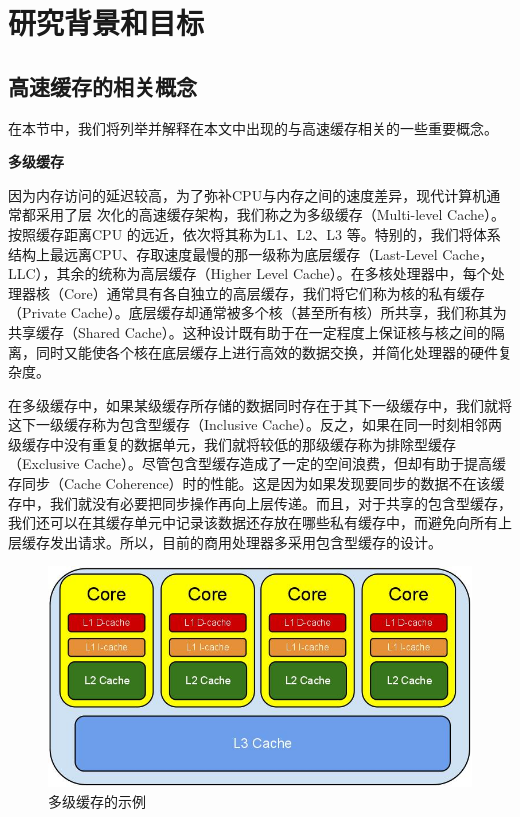 
\chapter{研究背景和目标} \label{chap:related}
\section{高速缓存的相关概念}
在本节中，我们将列举并解释在本文中出现的与高速缓存相关的一些重要概念。

\textbf{多级缓存}

因为内存访问的延迟较高，为了弥补CPU与内存之间的速度差异，现代计算机通常都采用了层
次化的高速缓存架构，我们称之为多级缓存（Multi-level Cache）。按照缓存距离CPU 的远近，依次将其称为L1、L2、L3 等。特别的，我们将体系结构上最远离CPU、存取速度最慢的那一级称为底层缓存（Last-Level Cache，LLC），其余的统称为高层缓存（Higher Level Cache）。在多核处理器中，每个处理器核（Core）通常具有各自独立的高层缓存，我们将它们称为核的私有缓存（Private Cache）。底层缓存却通常被多个核（甚至所有核）所共享，我们称其为共享缓存（Shared Cache）。这种设计既有助于在一定程度上保证核与核之间的隔离，同时又能使各个核在底层缓存上进行高效的数据交换，并简化处理器的硬件复杂度。

在多级缓存中，如果某级缓存所存储的数据同时存在于其下一级缓存中，我们就将这下一级缓存称为包含型缓存（Inclusive Cache）。反之，如果在同一时刻相邻两级缓存中没有重复的数据单元，我们就将较低的那级缓存称为排除型缓存（Exclusive Cache）。尽管包含型缓存造成了一定的空间浪费，但却有助于提高缓存同步（Cache Coherence）时的性能。这是因为如果发现要同步的数据不在该缓存中，我们就没有必要把同步操作再向上层传递。而且，对于共享的包含型缓存，我们还可以在其缓存单元中记录该数据还存放在哪些私有缓存中，而避免向所有上层缓存发出请求。所以，目前的商用处理器多采用包含型缓存的设计。

\begin{figure}[htbp] 
    \centering
    \includegraphics[width=0.7\linewidth]{figures/CacheHierarchy.jpg}
    \caption{多级缓存的示例}
    \label{fig:cache_hierarchy}
\end{figure}

